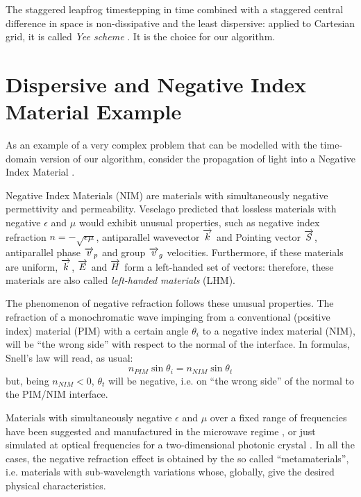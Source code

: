 The staggered leapfrog timestepping in time combined with a staggered
central difference in space is non-dissipative and the least
dispersive: applied to Cartesian grid, it is
called \emph{Yee scheme}
\cite{yee_numerical}. It is the choice for our algorithm.


\section{Dispersive and Negative Index Material Example}
 \label{sec:nim}

As an example of a very complex problem that can be modelled with the
time-domain version of our algorithm, consider the propagation of
light into a Negative Index Material \cite{bolla_energy}.

Negative Index Materials (NIM) are materials with simultaneously
negative permettivity and permeability. Veselago
\cite{veselago_electrodynamics} predicted that lossless materials with
negative $\epsilon$ and $\mu$ would exhibit unusual properties, such as
negative index refraction $n = -\sqrt{\epsilon \mu}$, antiparallel
wavevector $\overrightarrow{k}$ and Pointing vector $\overrightarrow{S}$, antiparallel
phase $\overrightarrow{v}_p$ and group $\overrightarrow{v}_g$ velocities. Furthermore,
if these materials are uniform, $\overrightarrow{k}$, $\overrightarrow{E}$ and
$\overrightarrow{H}$ form a left-handed set of vectors: therefore, these
materials are also called \emph{left-handed materials} (LHM).

The phenomenon of negative refraction follows these unusual
properties. The refraction of a monochromatic wave impinging from a
conventional (positive index) material (PIM) with a certain angle
$\theta_i$ to a negative index material (NIM), will be ``the wrong
side'' with respect to the normal of the interface. In formulas,
Snell's law will read, as usual:
\begin{equation*}
  n_{PIM} \sin{\theta_i} = n_{NIM} \sin{\theta_t}
\end{equation*}
but, being $n_{NIM} < 0$, $\theta_t$ will be negative, i.e. on ``the
wrong side'' of the normal to the PIM/NIM interface.

Materials with simultaneously negative $\epsilon$ and $\mu$ over a
fixed range of frequencies have been suggested \cite{pendry_extremely}
\cite{pendry_negative} and manufactured in the microwave
regime \cite{smith_composite}, or just simulated at optical
frequencies for a two-dimensional photonic crystal
\cite{foteinopoulou_refraction}. In all the cases, the negative
refraction effect is obtained by the so called ``metamaterials'',
i.e. materials with sub-wavelength variations whose, globally, give
the desired physical characteristics.

